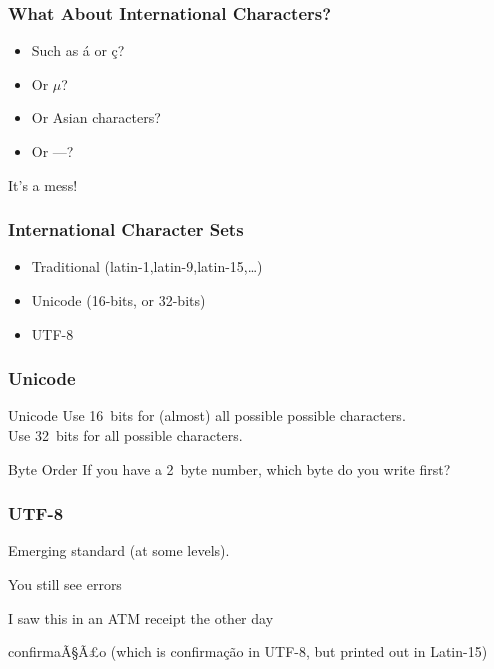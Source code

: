 \begin{frame}[fragile]
\frametitle{What About International Characters?}

\begin{itemize}
\item Such as \'{a} or \c{c}?
\item Or $\mu$?
\item Or Asian characters?
\item Or ---?

\end{itemize}
It's a mess!
\end{frame}

\begin{frame}[fragile]
\frametitle{International Character Sets}

\begin{itemize}
\item Traditional (latin-1,latin-9,latin-15,\ldots)
\item Unicode (16-bits, or 32-bits)
\item UTF-8
\end{itemize}
\end{frame}

\begin{frame}[fragile]
\frametitle{Unicode}

\begin{block}{Unicode}
Use 16~bits for (almost) all possible possible characters.\\
Use 32~bits for all possible characters.
\end{block}

\begin{block}{Byte Order}
If you have a 2~byte number, which byte do you write first?
\end{block}

\end{frame}

\begin{frame}[fragile]
\frametitle{UTF-8}
Emerging standard (at some levels).

\pause

You still see errors

I saw this in an ATM receipt the other day

confirmaÃ§Ã£o (which is confirmação in UTF-8, but printed out in Latin-15)

\end{frame}




